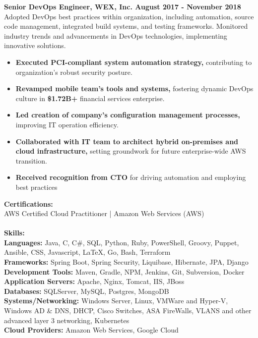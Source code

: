 \documentclass[10pt]{article}
\begin{document}
\normalsize
\noindent\textbf{Senior DevOps Engineer, WEX, Inc. \hfill{August 2017 - November 2018}}\\
\normalsize Adopted DevOps best practices within organization, including automation, source code management, integrated build systems, 
and testing frameworks. Monitored industry trends and advancements in DevOps technologies, implementing innovative solutions.
\begin{itemize}
\small
\item \textbf{Executed PCI-compliant system automation strategy,} contributing to organization's robust security posture.
\item \textbf{Revamped mobile team's tools and systems,} fostering dynamic DevOps culture in \textbf{\$1.72B+} financial services enterprise.
\item \textbf{Led creation of company's configuration management processes,} improving IT operation efficiency.
\item \textbf{Collaborated with IT team to architect hybrid on-premises and cloud infrastructure,} setting groundwork for future
enterprise-wide AWS transition.
\item \textbf{Received recognition from CTO} for driving automation and employing best practices
\end{itemize}
\normalsize

\noindent\Large\textbf{Certifications:}\\
\normalsize
AWS Certified Cloud Practitioner | Amazon Web Services (AWS)
\\
\\
\normalsize
\noindent\Large\textbf{Skills:}\\
\normalsize
\textbf{Languages:}
\normalsize Java, C, C{\#}, SQL, Python, Ruby, PowerShell, Groovy, Puppet, Ansible, CSS, Javascript, LaTeX, Go, Bash, Terraform \\
\textbf{Frameworks:}
\normalsize Spring Boot, Spring Security, Liquibase, Hibernate, JPA, Django \\
\textbf{Development Tools:}
\normalsize Maven, Gradle, NPM, Jenkins, Git, Subversion, Docker \\
\textbf{Application Servers:}
\normalsize Apache, Nginx, Tomcat, IIS, JBoss \\
\textbf{Databases:}
\normalsize SQLServer, MySQL, Postgres, MongoDB \\
\textbf{Systems/Networking:}
\normalsize Windows Server, Linux, VMWare and Hyper-V, Windows AD \& DNS, DHCP, Cisco Switches, ASA FireWalls, VLANS and other advanced layer 3 networking, Kubernetes \\
\textbf{Cloud Providers:}
\normalsize Amazon Web Services, Google Cloud
\\
\end{document}
